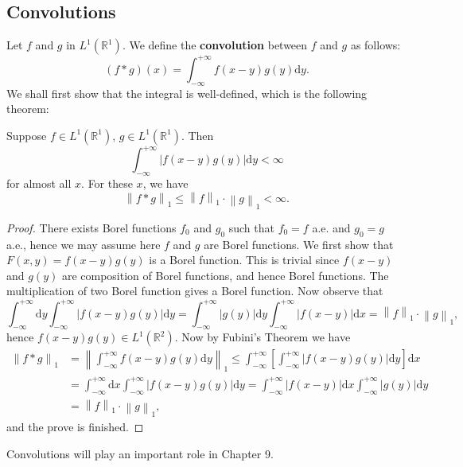 \subsection{Convolutions}
Let $f$ and $g$ in $L^1(\mathbb{R}^1)$. We define the \textbf{convolution} between $f$ and $g$ as follows: 
$$
\left( f*g \right) \left( x \right) =\int_{-\infty}^{+\infty}{f\left( x-y \right) g\left( y \right) \mathrm{d}y}.
$$
We shall first show that the integral is well-defined, which is the following theorem: 
\begin{theorem}
Suppose $f\in L^1(\mathbb{R}^1)$, $g\in L^1(\mathbb{R}^1)$. Then 
$$
\int_{-\infty}^{+\infty}{\left| f\left( x-y \right) g\left( y \right) \right|\mathrm{d}y}<\infty 
$$
for almost all $x$. For these $x$, we have 
$$
\left\| f*g \right\| _1\le \left\| f \right\| _1\cdot \left\| g \right\| _1<\infty .
$$
\end{theorem}
\begin{proof}
There exists Borel functions $f_0$ and $g_0$ such that $f_0=f$ a.e. and $g_0=g$ a.e., hence we may assume here $f$ and $g$ are Borel functions. We first show that $F(x,y)=f(x-y)g(y)$ is a Borel function. This is trivial since $f(x-y)$ and $g(y)$ are composition of Borel functions, and hence Borel functions. The multiplication of two Borel function gives a Borel function. Now observe that 
$$
\int_{-\infty}^{+\infty}{\mathrm{d}y\int_{-\infty}^{+\infty}{\left| f\left( x-y \right) g\left( y \right) \right|\mathrm{d}y}}=\int_{-\infty}^{+\infty}{\left| g\left( y \right) \right|\mathrm{d}y\int_{-\infty}^{+\infty}{\left| f\left( x-y \right) \right|\mathrm{d}x}}=\left\| f \right\| _1\cdot \left\| g \right\| _1,
$$
hence $f(x-y)g(y)\in L^1(\mathbb{R}^2)$. Now by Fubini's Theorem we have 
$$
\begin{aligned}
\left\| f*g \right\| _1&=\left\| \int_{-\infty}^{+\infty}{f\left( x-y \right) g\left( y \right) \mathrm{d}y} \right\| _1\le \int_{-\infty}^{+\infty}{\left[ \int_{-\infty}^{+\infty}{\left| f\left( x-y \right) g\left( y \right) \right|\mathrm{d}y} \right] \mathrm{d}x}
\\
&=\int_{-\infty}^{+\infty}{\mathrm{d}x\int_{-\infty}^{+\infty}{\left| f\left( x-y \right) g\left( y \right) \right|\mathrm{d}y}}=\int_{-\infty}^{+\infty}{\left| f\left( x-y \right) \right|\mathrm{d}x\int_{-\infty}^{+\infty}{\left| g\left( y \right) \right|\mathrm{d}y}}
\\
&=\left\| f \right\| _1\cdot \left\| g \right\| _1,
\end{aligned}
$$
and the prove is finished.
\end{proof}
Convolutions will play an important role in Chapter 9.

